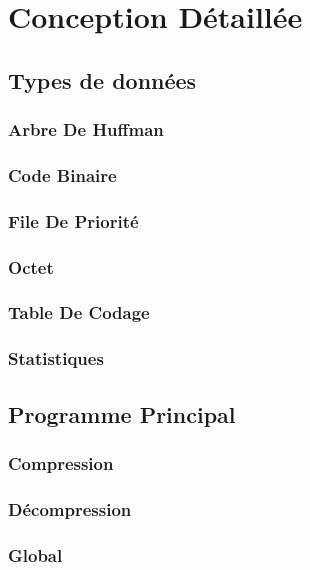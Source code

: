 \documentclass{article}
\begin{document}
\section{Conception Détaillée}
\subsection{Types de données}
\subsubsection{Arbre De Huffman}
	
\subsubsection{Code Binaire}
	
\subsubsection{File De Priorité}
	
\subsubsection{Octet}
	
\subsubsection{Table De Codage}
	
\subsubsection{Statistiques}
	
\subsection{Programme Principal}
\subsubsection{Compression}
	
\subsubsection{Décompression}
	
\subsubsection{Global}
	
\end{document}
